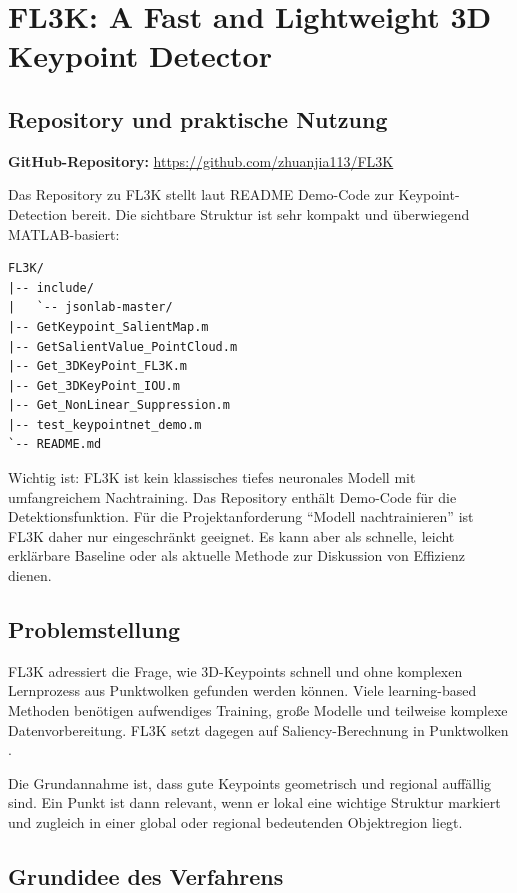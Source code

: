 \documentclass[11pt,a4paper]{article}
\begin{document}
\section{FL3K: A Fast and Lightweight 3D Keypoint Detector}

\subsection{Repository und praktische Nutzung}

\textbf{GitHub-Repository:} \url{https://github.com/zhuanjia113/FL3K}

Das Repository zu FL3K stellt laut README Demo-Code zur Keypoint-Detection bereit. Die sichtbare Struktur ist sehr kompakt und überwiegend MATLAB-basiert:

\begin{lstlisting}
FL3K/
|-- include/
|   `-- jsonlab-master/
|-- GetKeypoint_SalientMap.m
|-- GetSalientValue_PointCloud.m
|-- Get_3DKeyPoint_FL3K.m
|-- Get_3DKeyPoint_IOU.m
|-- Get_NonLinear_Suppression.m
|-- test_keypointnet_demo.m
`-- README.md
\end{lstlisting}

Wichtig ist: FL3K ist kein klassisches tiefes neuronales Modell mit umfangreichem Nachtraining. Das Repository enthält Demo-Code für die Detektionsfunktion. Für die Projektanforderung \enquote{Modell nachtrainieren} ist FL3K daher nur eingeschränkt geeignet. Es kann aber als schnelle, leicht erklärbare Baseline oder als aktuelle Methode zur Diskussion von Effizienz dienen.

\subsection{Problemstellung}

FL3K adressiert die Frage, wie 3D-Keypoints schnell und ohne komplexen Lernprozess aus Punktwolken gefunden werden können. Viele learning-based Methoden benötigen aufwendiges Training, große Modelle und teilweise komplexe Datenvorbereitung. FL3K setzt dagegen auf Saliency-Berechnung in Punktwolken \cite{yang2025fl3k}.

Die Grundannahme ist, dass gute Keypoints geometrisch und regional auffällig sind. Ein Punkt ist dann relevant, wenn er lokal eine wichtige Struktur markiert und zugleich in einer global oder regional bedeutenden Objektregion liegt.

\subsection{Grundidee des Verfahrens}
\end{document}
